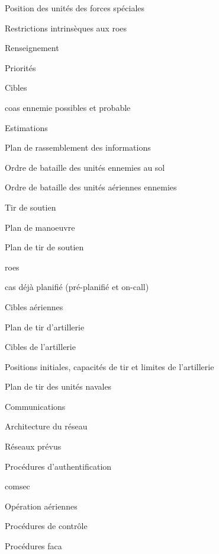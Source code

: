 \begin{e1}
\begin{e2}
\begin{e3}
\begin{e4}
\begin{e5}
					\item Position des unités des forces spéciales
					\item Restrictions intrinsèques aux \glspl{roe}
				\end{e5}
				\item Renseignement
				\begin{e5}[-1em]
					\item Priorités
					\item Cibles
					\item \glspl{coa} ennemie possibles et probable
					\item Estimations
					\item Plan de rassemblement des informations
					\item Ordre de bataille des unités ennemies au sol
					\item Ordre de bataille des unités aériennes ennemies
				\end{e5}
				\item Tir de soutien
				\begin{e5}[-1em]
					\item Plan de manoeuvre
					\item Plan de tir de soutien
					\item \glspl{roe}
					\item \gls{cas} déjà planifié (pré-planifié et on-call)
					\item Cibles aériennes
					\item Plan de tir d'artillerie
					\item Cibles de l'artillerie
					\item Positions initiales, capacités de tir et limites de l'artillerie
					\item Plan de tir des unités navales
				\end{e5}
				\item Communications
				\begin{e5}[-1em]
					\item Architecture du réseau
					\item Réseaux prévus
					\item Procédures d'authentification
					\item \gls{comsec}
				\end{e5}
				\item Opération aériennes
				\begin{e5}[-1em]
					\item Procédures de contrôle
					\item Procédures \gls{faca}

\end{e5}
\end{e4}
\end{e3}
\end{e2}
\end{e1}
